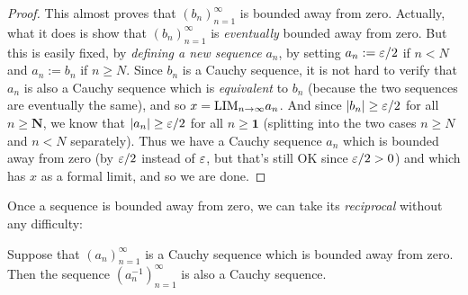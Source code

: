 \begin{proof}
This almost proves that \((b_n)_{n = 1}^{\infty}\) is bounded away from zero.
Actually, what it does is show that \((b_n)_{n = 1}^{\infty}\) is \emph{eventually} bounded away from zero.
But this is easily fixed, by \emph{defining a new sequence} \(a_n\), by setting \(a_n := \varepsilon/2\) if \(n < N\) and \(a_n := b_n\) if \(n \ge N\).
Since \(b_n\) is a Cauchy sequence, it is not hard to verify that \(a_n\) is also a Cauchy sequence which is \emph{equivalent} to \(b_n\) (because the two sequences are eventually the same),
and so \(x = \text{LIM}_{n \to \infty} a_n\).
And since \(\lvert b_n\rvert \ge \varepsilon/2\) for all \(n \ge \textbf{N}\), we know that \(\lvert a_n\rvert \ge \varepsilon/2\) for all \(n \ge \textbf{1}\)
(splitting into the two cases \(n \ge N\) and \(n < N\) separately).
Thus we have a Cauchy sequence \(a_n\) which is bounded away from zero (by \(\varepsilon/2\) instead of \(\varepsilon\), but that’s still OK since \(\varepsilon/2 > 0\)) and which has \(x\) as a formal limit, and so we are done.
\end{proof}

Once a sequence is bounded away from zero, we can take its \emph{reciprocal} without any difficulty:

\begin{lemma} \label{lem 5.3.15}
Suppose that \((a_n)_{n = 1}^{\infty}\) is a Cauchy sequence which is bounded away from zero.
Then the sequence \((a_n^{-1})_{n = 1}^{\infty}\) is also a Cauchy sequence.
\end{lemma}

